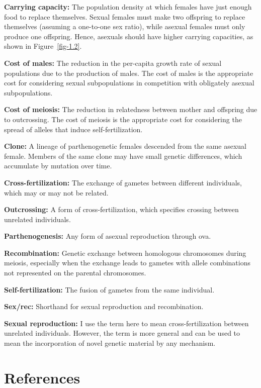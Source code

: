 \documentclass[
  letterpaper,
]{book}
\begin{document}
\textbf{Carrying capacity:} The population density at which females have
just enough food to replace themselves. Sexual females must make two
offspring to replace themselves (assuming a one-to-one sex ratio), while
asexual females must only produce one offspring. Hence, asexuals should
have higher carrying capacities, as shown in Figure~\ref{fig-1.2}.

\textbf{Cost of males:} The reduction in the per-capita growth rate of
sexual populations due to the production of males. The cost of males is
the appropriate cost for considering sexual subpopulations in
competition with obligately asexual subpopulations.

\textbf{Cost of meiosis:} The reduction in relatedness between mother
and offspring due to outcrossing. The cost of meiosis is the appropriate
cost for considering the spread of alleles that induce
self-fertilization.

\textbf{Clone:} A lineage of parthenogenetic females descended from the
same asexual female. Members of the same clone may have small genetic
differences, which accumulate by mutation over time.

\textbf{Cross-fertilization:} The exchange of gametes between different
individuals, which may or may not be related.

\textbf{Outcrossing:} A form of cross-fertilization, which specifies
crossing between unrelated individuals.

\textbf{Parthenogenesis:} Any form of asexual reproduction through ova.

\textbf{Recombination:} Genetic exchange between homologous chromosomes
during meiosis, especially when the exchange leads to gametes with
allele combinations not represented on the parental chromosomes.

\textbf{Self-fertilization:} The fusion of gametes from the same
individual.

\textbf{Sex/rec:} Shorthand for sexual reproduction and recombination.

\textbf{Sexual reproduction:} I use the term here to mean
cross-fertilization between unrelated individuals. However, the term is
more general and can be used to mean the incorporation of novel genetic
material by any mechanism.


\chapter*{References}\label{references}
\end{document}
